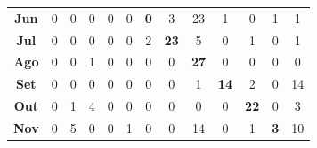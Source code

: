 \documentclass[
	12pt,				%
	openright,			%
	twoside,			%
	a4paper,			%
	english,			%
	brazil,				%
	svgnames
	]{abntex2}\usepackage[]{graphicx}\usepackage[]{color}
\begin{document}
\begin{table}[h]
\begin{tabular}{c|cccccccccccc}
\textbf{Jun} & 0                                & 0                                & 0                                & 0                                & \multicolumn{1}{c|}{0}          & \multicolumn{1}{c|}{\textbf{0}} & 3                                & 23                               & 1                                & 0                                & 1                               & 1                                \\ \cline{7-8}
\textbf{Jul} & 0                                & 0                                & 0                                & 0                                & 0                               & \multicolumn{1}{c|}{2}          & \multicolumn{1}{c|}{\textbf{23}} & 5                                & 0                                & 1                                & 0                               & 1                                \\ \cline{8-9}
\textbf{Ago} & 0                                & 0                                & 1                                & 0                                & 0                               & 0                               & \multicolumn{1}{c|}{0}           & \multicolumn{1}{c|}{\textbf{27}} & 0                                & 0                                & 0                               & 0                                \\ \cline{9-10}
\textbf{Set} & 0                                & 0                                & 0                                & 0                                & 0                               & 0                               & 0                                & \multicolumn{1}{c|}{1}           & \multicolumn{1}{c|}{\textbf{14}} & 2                                & 0                               & 14                               \\ \cline{10-11}
\textbf{Out} & 0                                & 1                                & 4                                & 0                                & 0                               & 0                               & 0                                & 0                                & \multicolumn{1}{c|}{0}           & \multicolumn{1}{c|}{\textbf{22}} & 0                               & 3                                \\ \cline{11-12}
\textbf{Nov} & 0                                & 5                                & 0                                & 0                                & 1                               & 0                               & 0                                & 14                               & 0                                & \multicolumn{1}{c|}{1}           & \multicolumn{1}{c|}{\textbf{3}} & 10                               \\ \cline{12-13} 

\end{tabular}
\end{table}
\end{document}
